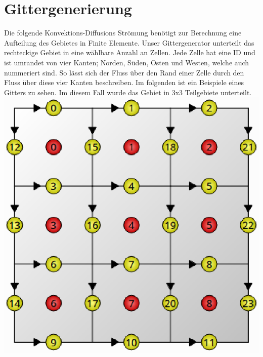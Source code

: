 \documentclass{article}
\begin{document}
\section{Gittergenerierung}
Die folgende Konvektions-Diffusions Strömung benötigt zur Berechnung eine Aufteilung des Gebietes in Finite Elemente.
Unser Gittergenerator unterteilt das rechteckige Gebiet in eine wählbare Anzahl an Zellen. Jede Zelle hat eine ID und ist 
umrandet von vier Kanten; Norden, Süden, Osten und Westen, welche auch nummeriert sind. So lässt sich der Fluss über den Rand
einer Zelle durch den Fluss über diese vier Kanten beschreiben.
Im folgenden ist ein Beispiele eines Gitters zu sehen. Im diesem Fall wurde das Gebiet in 3x3 Teilgebiete unterteilt.\\
\includegraphics[scale=0.5]{test/4grid/1.eps}
\end{document}
